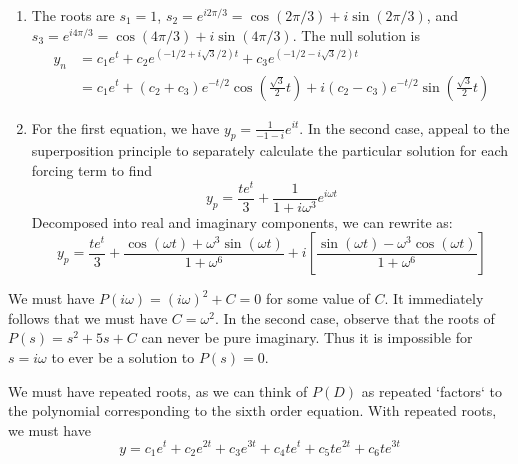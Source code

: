 \documentclass[a4paper]{article}
\begin{document}
\begin{enumerate}[label=(\alph*)]
	\item The roots are \( s_{1} = 1 \), \( s_{2} = e^{i 2 \pi / 3} = \cos\!\left(2 \pi / 3\right) + i \sin\!\left(2 \pi / 3\right)  \), and \( s_{3} = e^{i 4 \pi / 3} = \cos\!\left(4 \pi / 3 \right) + i \sin\!\left(4 \pi / 3 \right) \). The null solution is
	\begin{align*}
		y_{n } & = c_{1}e^{t} + c_{2}e^{\!\left( -1/2 + i \sqrt{3}/2 \right)t } + c_{3}e^{\!\left( -1/2 - i \sqrt{3}/2 \right)t } \\
		       & = c_{1}e^{t } + \!\left( c_{2} + c_{3} \right)e^{-t/2}\cos\!\left( \frac{\sqrt{3}}{2}t \right) + i \!\left( c_{2} - c_{3} \right)e^{-t/2}\sin\!\left( \frac{\sqrt{3}}{2}t \right)
        \end{align*}	
\item For the first equation, we have \( \displaystyle{y_{p} = \frac{1}{-1-i}}e^{it} \). In the second case, appeal to the superposition principle to separately calculate the particular solution for each forcing term to find
	\[
		y_{p } = \frac{te^{t }}{3} + \frac{1}{1 + i \omega^{3}} e^{i \omega t} 
	\]
	Decomposed into real and imaginary components, we can rewrite as:
	\[
		y_{p } = \frac{te^{t }}{3} + \frac{\cos\!\left(\omega t \right) + \omega^{3} \sin\!\left(\omega t \right) }{1 + \omega^{6}} + i \!\left[ \frac{\sin\!\left(\omega t \right)  - \omega^{3} \cos\!\left(\omega t \right) }{1 + \omega^{6}} \right] 
	\]
\end{enumerate}


We must have \( P \!\left( i \omega  \right) = \!\left( i \omega \right)^{2} + C = 0\) for some value of \( C  \). It immediately follows that we must have \( C = \omega^{2} \). In the second case, observe that the roots of \( P \!\left( s  \right) = s^{2} + 5s + C  \) can never be pure imaginary. Thus it is impossible for \( s = i \omega \) to ever be a solution to \( P \!\left( s  \right) = 0 \).


We must have repeated roots, as we can think of \( P \!\left( D  \right) \) as repeated `factors` to the polynomial corresponding to the sixth order equation. With repeated roots, we must have
\[
	y = c_{1}e^{t} + c_{2}e^{2t} + c_{3}e^{3t} + c_{4}te^{t} + c_{5}te^{2t} + c_{6}te^{3t} 
\]
\end{document}
